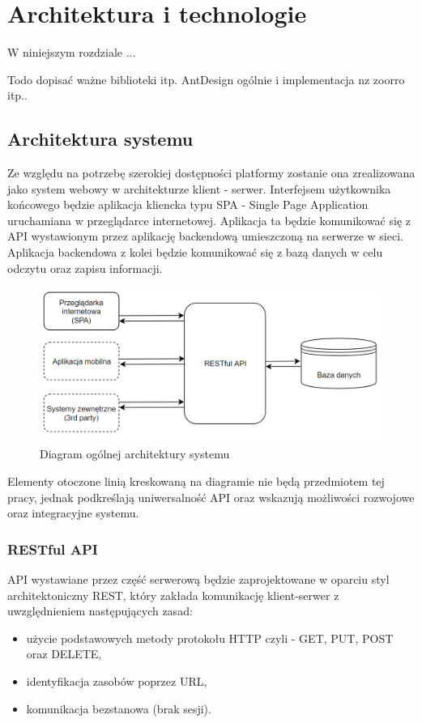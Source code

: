 \chapter{Architektura i technologie}

W niniejszym rozdziale ...

Todo dopisać ważne biblioteki itp. AntDesign ogólnie i implementacja nz zoorro itp..

\section{Architektura systemu}

Ze względu na potrzebę szerokiej dostępności platformy zostanie ona zrealizowana jako system webowy w architekturze klient - serwer. Interfejsem użytkownika końcowego będzie aplikacja kliencka typu SPA - Single Page Application uruchamiana w przeglądarce internetowej. Aplikacja ta będzie komunikować się z API wystawionym przez aplikację backendową umieszczoną na serwerze w sieci.  Aplikacja backendowa z kolei będzie komunikować się z bazą danych w celu odczytu oraz zapisu informacji. 

\begin{figure}[ht]
\centering
\includegraphics[width=0.8\linewidth]{05-architektura-i-technologie/rys/ogolna-architektura.PNG}
\caption{Diagram ogólnej architektury systemu}
\label{fig:diagram-og-architekt}
\end{figure}

Elementy otoczone linią kreskowaną na diagramie nie będą przedmiotem tej pracy, jednak podkreślają uniwersalność API oraz wskazują możliwości rozwojowe oraz integracyjne systemu.

\subsection{RESTful API}
API wystawiane przez część serwerową będzie zaprojektowane w oparciu styl architektoniczny REST, który zakłada komunikację klient-serwer z uwzględnieniem następujących zasad: 
\begin{itemize}
\item użycie podstawowych metody protokołu HTTP czyli - GET, PUT, POST oraz DELETE,
\item identyfikacja zasobów poprzez URL,
\item komunikacja bezstanowa (brak sesji).
\end{itemize}

